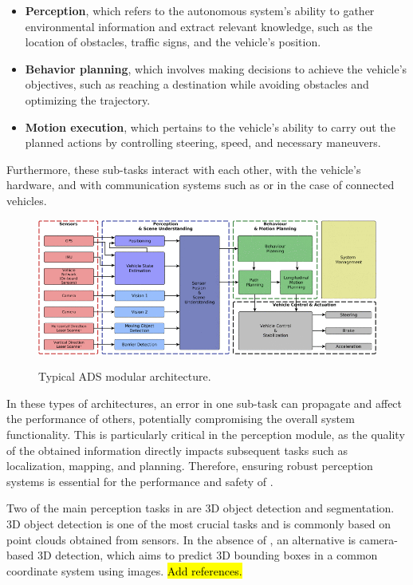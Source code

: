 \begin{itemize}  
    \item \textbf{Perception}, which refers to the autonomous system's ability to gather environmental information and extract relevant knowledge, such as the location of obstacles, traffic signs, and the vehicle’s position.  
    \item \textbf{Behavior planning}, which involves making decisions to achieve the vehicle's objectives, such as reaching a destination while avoiding obstacles and optimizing the trajectory.  
    \item \textbf{Motion execution}, which pertains to the vehicle’s ability to carry out the planned actions by controlling steering, speed, and necessary maneuvers.  
\end{itemize}

Furthermore, these \mbox{sub-tasks} interact with each other, with the vehicle's hardware, and with communication systems such as  or  in the case of connected vehicles.

\begin{figure}[H]
    \centering
    \includegraphics[width=\linewidth]{images/sota/ADS_information_flow.png}
    \label{sota_ads_information_flow}
    \caption{Typical ADS modular architecture.}
\end{figure}

In these types of architectures, an error in one \mbox{sub-task} can propagate and affect the performance of others, potentially compromising the overall system functionality. This is particularly critical in the perception module, as the quality of the obtained information directly impacts subsequent tasks such as localization, mapping, and planning. Therefore, ensuring robust perception systems is essential for the performance and safety of .

Two of the main perception tasks in  are 3D object detection and  segmentation. 3D object detection is one of the most crucial tasks and is commonly based on point clouds obtained from  sensors. In the absence of , an alternative is camera-based 3D detection, which aims to predict 3D bounding boxes in a common coordinate system using images. \hl{Add references.}

